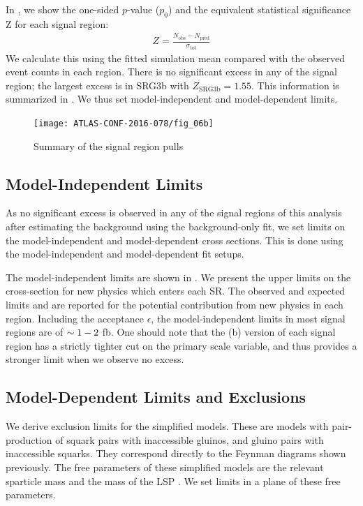 In , we show the one-sided $p$-value ($p_0$) and the equivalent statistical significance Z for each signal region:
\begin{align}
Z = \frac{N_{\mathrm{obs}} - N_{\mathrm{pred}}}{\sigma_{\mathrm{tot}}}
\end{align}
We calculate this using the fitted simulation mean compared with the observed event counts in each region.
There is no significant excess in any of the signal region; the largest excess is in SRG3b with $Z_{\text{SRG3b}} = 1.55$.
This information is summarized in .
We thus set model-independent and model-dependent limits.

\begin{figure}[tbp]
\centering
\caption{Summary of the signal region pulls} \label{fig:sr_summary}
\texttt{[image: ATLAS-CONF-2016-078/fig\_06b]}
\end{figure}


\subsection{Model-Independent Limits}

As no significant excess is observed in any of the signal regions of this analysis after estimating the background using the background-only fit, we set limits on the model-independent and model-dependent cross sections.
This is done using the model-independent and model-dependent fit setups.

The model-independent limits are shown in .
We present the upper limits on the cross-section for new physics which enters each SR.
The observed and expected limits \sobs and \sexp are reported for the potential contribution from new physics in each region.
Including the acceptance $\epsilon$, the model-independent limits in most signal regions are of $\sim 1-2$ fb.
One should note that the (b) version of each signal region has a strictly tighter cut on the primary scale variable, and thus provides a stronger limit when we observe no excess.

\subsection{Model-Dependent Limits and Exclusions}

We derive exclusion limits for the simplified models.
These are models with pair-production of squark pairs with inaccessible gluinos, and gluino pairs with inaccessible squarks.
They correspond directly to the Feynman diagrams shown previously.
The free parameters of these simplified models are the relevant sparticle mass and the mass of the LSP \lsp.
We set limits in a plane of these free parameters.

